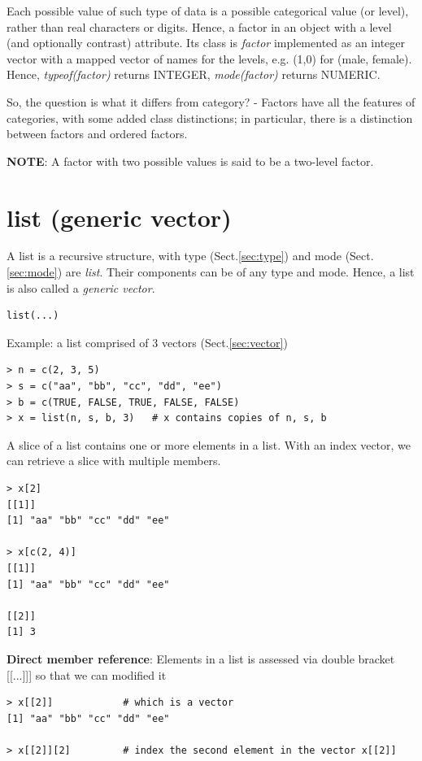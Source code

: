 Each possible value of such type of data is a possible categorical
value (or level), rather than real characters or digits. Hence, a
factor in an object with a level (and optionally contrast)
attribute. Its class is {\it factor} implemented as an integer vector
with a mapped vector of names for the levels, e.g. (1,0) for (male,
female). Hence, {\it typeof(factor)} returns INTEGER,
{\it mode(factor)} returns NUMERIC.


So, the question is what it differs from category? - Factors have all
the features of categories, with some added class distinctions; in
particular, there is a distinction between factors and ordered
factors.

{\bf NOTE}: A factor with two possible values is said to be a
two-level factor.




\section{list (generic vector)}
\label{sec:list}

A list is a recursive structure, with type (Sect.\ref{sec:type}) and mode
(Sect.\ref{sec:mode}) are {\it list}. Their components can be of any type and
mode. Hence, a list is also called a {\it generic vector}.
\begin{lstlisting}
list(...)
\end{lstlisting}

Example: a list comprised of 3 vectors (Sect.\ref{sec:vector})
\begin{verbatim}
> n = c(2, 3, 5) 
> s = c("aa", "bb", "cc", "dd", "ee") 
> b = c(TRUE, FALSE, TRUE, FALSE, FALSE) 
> x = list(n, s, b, 3)   # x contains copies of n, s, b 
\end{verbatim}

A slice of a list contains one or more elements in a list.
With an index vector, we can retrieve a slice with multiple members.
\begin{verbatim}
> x[2] 
[[1]] 
[1] "aa" "bb" "cc" "dd" "ee" 

> x[c(2, 4)] 
[[1]] 
[1] "aa" "bb" "cc" "dd" "ee" 
 
[[2]] 
[1] 3 
\end{verbatim}

{\bf Direct member reference}:
Elements in a list is assessed via double bracket [[...]]] so that we can
modified it
\begin{verbatim}
> x[[2]]            # which is a vector
[1] "aa" "bb" "cc" "dd" "ee" 

> x[[2]][2]         # index the second element in the vector x[[2]]
\end{verbatim}


